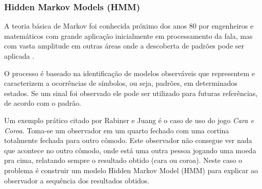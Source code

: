 
\subsubsection{Hidden Markov Models (HMM)}
\label{tecnica-hmm}

A teoria básica de Markov foi conhecida próximo dos anos 80 por engenheiros e matemáticos com grande aplicação inicialmente em processamento da fala, mas com vasta amplitude em outras áreas onde a descoberta de padrões pode ser aplicada \cite{Rabiner-HMM}.

O processo é baseado na identificação de modelos observáveis que representem e caracterizem a ocorrências de símbolos, ou seja, padrões, em determinados estados. Se um sinal foi observado ele pode ser utilizado para futuras referências, de acordo com o padrão. 

Um exemplo prático citado por Rabiner e Juang \cite{Rabiner-HMM} é o caso de uso do jogo  \textit{Cara e Coroa}. Toma-se um observador em um quarto fechado com uma cortina totalmente fechada para outro cômodo. Este observador não consegue ver nada que acontece no outro cômodo, onde está uma outra pessoa jogando uma moeda pra cima, relatando sempre o resultado obtido (cara ou coroa). Neste caso o problema é construir um modelo Hidden Markov Model (HMM) para explicar ao observador a sequência dos resultados obtidos. 

